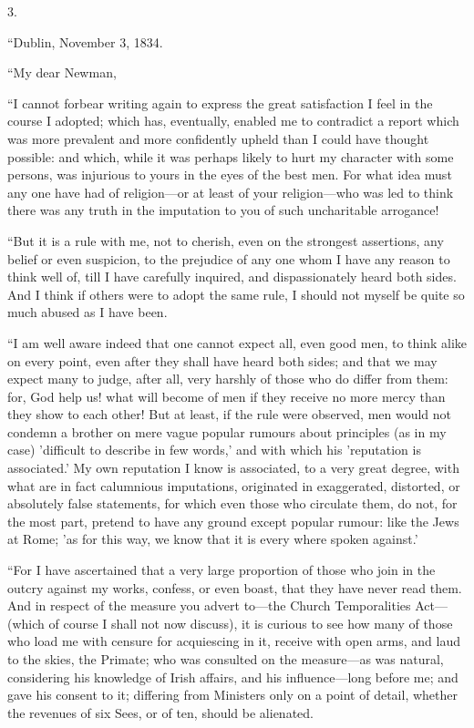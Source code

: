 3.

``Dublin, November 3, 1834.

``My dear Newman,

``I cannot forbear writing again to express the great satisfaction I
feel in the course I adopted; which has, eventually, enabled me to
contradict a report which was more prevalent and more confidently upheld
than I could have thought possible: and which, while it was perhaps
likely to hurt my character with some persons, was injurious to yours in
the eyes of the best men. For what idea must any one have had of
religion—or at least of your religion—who was led to think there was
any truth in the imputation to you of such uncharitable arrogance!

``But it is a rule with me, not to cherish, even on
the strongest assertions, any belief or even suspicion, to the prejudice
of any one whom I have any reason to think well of, till I have
carefully inquired, and dispassionately heard both sides. And I think if
others were to adopt the same rule, I should not myself be quite so much
abused as I have been.

``I am well aware indeed that one cannot expect all,
even good men, to think alike on every point, even after they
shall have heard both sides; and that we may expect many to judge, after
all, very harshly of those who do differ from them: for, God help us!
what will become of men if they receive no more mercy than they show to
each other! But at least, if the rule were observed, men would not
condemn a brother on mere vague popular rumours about principles (as in
my case) 'difficult to describe in few words,' and with which his
'reputation is associated.' My own reputation I know is associated, to a
very great degree, with what are in fact calumnious imputations,
originated in exaggerated, distorted, or absolutely false statements,
for which even those who circulate them, do not, for the most part,
pretend to have any ground except popular rumour: like the Jews at Rome;
'as for this way, we know that it is every where spoken against.'

``For I have ascertained that a very large
proportion of those who join in the outcry against my works, confess, or
even boast, that they have never read them. And in respect of the
measure you advert to—the Church Temporalities Act—(which of course
I shall not now discuss), it is curious to see how many of those who
load me with censure for acquiescing in it, receive with open arms, and
laud to the skies, the Primate; who was consulted on the measure—as
was natural, considering his knowledge of Irish affairs, and his
influence—long before me; and gave his consent to it; differing from
Ministers only on a point of detail, whether the revenues of six Sees,
or of ten, should be alienated.

